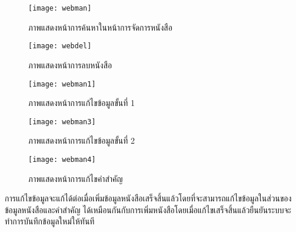 \begin{figure}[H]
    \centering
    \texttt{[image: webman]}
    \caption{ภาพแสดงหน้าการค้นหาในหน้าการจัดการหนังสือ}\label{fig:webman}
\end{figure}

\begin{figure}[H]
    \centering
    \texttt{[image: webdel]}
    \caption{ภาพแสดงหน้าการลบหนังสือ}\label{fig:webdel}
\end{figure}

\begin{figure}[H]
    \centering
    \texttt{[image: webman1]}
    \caption{ภาพแสดงหน้าการแก้ไขข้อมูลขั้นที่ 1}\label{fig:webman1}
\end{figure}

\begin{figure}[H]
    \centering
    \texttt{[image: webman3]}
    \caption{ภาพแสดงหน้าการแก้ไขข้อมูลขั้นที่ 2}\label{fig:webman2}
\end{figure}

\begin{figure}[H]
    \centering
    \texttt{[image: webman4]}
    \caption{ภาพแสดงหน้าการแก้ไขคำสำคัญ}\label{fig:webman4}
\end{figure}

การแก้ไขข้อมูลจะแก้ได้ต่อเมื่อเพิ่มข้อมูลหนังสือเสร็จสิ้นแล้วโดยที่จะสามารถแก้ไขข้อมูลในส่วนของข้อมูลหนังสือและคำสำคัญ ได้เหมือนกันกับการเพิ่มหนังสือโดยเมื่อแก้ไขเสร็จสิ้นแล้วยืนยันระบบจะทำการบันทึกข้อมูลใหม่ให้ทันที